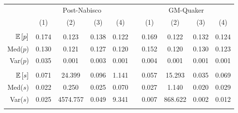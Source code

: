 \begin{tabular}{r|ccccccccc}
 & \multicolumn{4}{c}{Post-Nabisco} & & \multicolumn{4}{c}{GM-Quaker} \\ 
 & (1) & (2) & (3) & (4) && (1) & (2) & (3) & (4) \\\hline&&&&&&&&&\\ 
$\mathbb{E}\left[p\right]$ & 0.174 & 0.123  & 0.138  & 0.122&& 0.169 & 0.122  & 0.132  & 0.124 \\ 
Med($p$)& 0.130 & 0.121 & 0.127 & 0.120&& 0.152 & 0.120  & 0.130  & 0.123 \\ 
Var($p$)& 0.035 & 0.001 & 0.003 & 0.001&& 0.004 & 0.001  & 0.001  & 0.001 \\
 &&&&&&&&&\\ 
$\mathbb{E}\left[s\right]$ & 0.071 & 24.399  & 0.096  & 1.141&& 0.057 & 15.293  & 0.035  & 0.069 \\ 
Med($s$)& 0.022 & 0.250 & 0.025 & 0.070&& 0.027 & 1.140  & 0.020  & 0.029 \\ 
Var($s$)& 0.025 & 4574.757 & 0.049 & 9.341&& 0.007 & 868.622  & 0.002  & 0.012 \\
 &&&&&&&&&\\ 
\end{tabular}